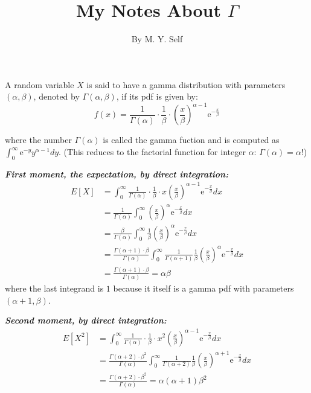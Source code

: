 \documentclass[12pt]{article}
\begin{document}
 \renewcommand{\arraystretch}{1.3}

 
\title{My Notes About $\Gamma$}%
\author{By M. Y. Self} %
 
\maketitle
 A random variable $X$ is said to have a gamma distribution with parameters $(\alpha, \beta)$, denoted by  $\Gamma(\alpha, \beta)$, if its  pdf is given by:
$$
		f(x) = \frac{1}{\Gamma({\alpha})} \cdot \frac{1}{\beta} \cdot  \left( \frac{x}{\beta}\right)^{\alpha - 1} \mathrm{e}^{-\frac{x}{\beta}}
$$

where the number $\Gamma(\alpha)$ is called the gamma fuction and is computed as $\int_0^{\infty} \mathrm{e}^{-y} y^{\alpha - 1} dy$. (This reduces to the factorial function for integer $\alpha$: $\Gamma(\alpha) = \alpha!$)


\bigskip

 
 \textbf{\color{TealBlue}\emph{First moment, the expectation, by direct integration:} } 
\begin{align*}
E[X] &= \int_0^{\infty}  \frac{1}{\Gamma({\alpha})} \cdot \frac{1}{\beta} \cdot x  \left( \frac{x}{\beta}\right)^{\alpha - 1} \mathrm{e}^{-\frac{x}{\beta}} dx \\
&=   \frac{1}{\Gamma({\alpha})} \int_0^{\infty} \left( \frac{x}{\beta}\right)^{\alpha} \mathrm{e}^{-\frac{x}{\beta}} dx \\
&=   \frac{\beta}{\Gamma({\alpha})} \int_0^{\infty} \frac{1}{\beta} \left( \frac{x}{\beta}\right)^{\alpha} \mathrm{e}^{-\frac{x}{\beta}} dx \\
&=   \frac{ \Gamma({\alpha} + 1) \cdot \beta }{\Gamma({\alpha})} \int_0^{\infty} \frac{1}{\Gamma(\alpha + 1)} \frac{1}{\beta} \left( \frac{x}{\beta}\right)^{\alpha} \mathrm{e}^{-\frac{x}{\beta}} dx \\   
&=  \frac{ \Gamma({\alpha} + 1) \cdot \beta }{\Gamma({\alpha})}  = \alpha\beta
\end{align*}
where the last integrand is $1$ because it itself is a gamma pdf with parameters $(\alpha + 1, \beta)$. 


\bigskip

 \textbf{\color{TealBlue}\emph{Second moment, by direct integration:} } 
\begin{align*}
E[X^2] &= \int_0^{\infty}  \frac{1}{\Gamma({\alpha})} \cdot \frac{1}{\beta} \cdot x^2  \left( \frac{x}{\beta}\right)^{\alpha - 1} \mathrm{e}^{-\frac{x}{\beta}} dx \\
&=   \frac{\Gamma(\alpha + 2) \cdot \beta^2}{\Gamma({\alpha})} \int_0^{\infty} \frac{1}{\Gamma(\alpha + 2)} \frac{1}{\beta} \left( \frac{x}{\beta}\right)^{\alpha +1 } \mathrm{e}^{-\frac{x}{\beta}} dx \\
&=  \frac{ \Gamma({\alpha} + 2) \cdot \beta^2 }{\Gamma({\alpha})}  = \alpha (\alpha + 1) \beta^2
\end{align*}
\end{document}
